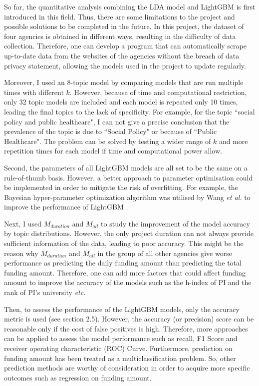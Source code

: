 So far, the quantitative analysis combining the LDA model and LightGBM is first introduced in this field. Thus, there are some limitations to the project and possible solutions to be completed in the future. In this project, the dataset of four agencies is obtained in different ways, resulting in the difficulty of data collection. Therefore, one can develop a program that can automatically scrape up-to-date data from the websites of the agencies without the breach of data privacy statement, allowing the models used in the project to update regularly.

Moreover, I used an 8-topic model by comparing models that are run multiple times with different $k$. However, because of time and computational restriction, only 32 topic models are included and each model is repeated only 10 times, leading the final topics to the lack of specificity. For example, for the topic ``social policy and public healthcare", I can not give a precise conclusion that the prevalence of the topic is due to ``Social Policy" or because of ``Public Healthcare". The problem can be solved by testing a wider range of $k$ and more repetition times for each model if time and computational power allow.

Second, the parameters of all LightGBM models are all set to be the same on a rule-of-thumb basis. However, a better approach to parameter optimisation could be implemented in order to mitigate the risk of overfitting. For example, the Bayesian hyper-parameter optimization algorithm was utilised by Wang \textit{et al.} to improve the performance of LightGBM \cite{wang2020}.

Next, I used $M_{duration}$ and $M_{all}$ to study the improvement of the model accuracy by topic distributions. However, the only project duration can not always provide sufficient information of the data, leading to poor accuracy. This might be the reason why $M_{duration}$ and $M_{all}$ in the group of all other agencies give worse performance as predicting the daily funding amount than predicting the total funding amount. Therefore, one can add more factors that could affect funding amount to improve the accuracy of the models such as the h-index of PI and the rank of PI's university \textit{etc.}

Then, to assess the performance of the LightGBM models, only the accuracy metric is used (see section 2.5). However, the accuracy (or precision) score can be reasonable only if the cost of false positives is high. Therefore, more approaches can be applied to assess the model performance such as recall, F1 Score and receiver operating characteristic (ROC) Curve. Furthermore, prediction on funding amount has been treated as a multiclassification problem. So, other prediction methods are worthy of consideration in order to acquire more specific outcomes such as regression on funding amount.

